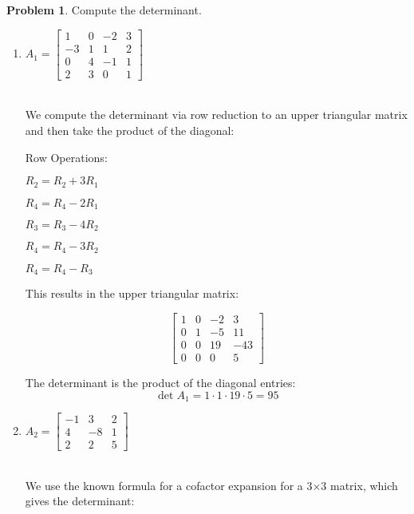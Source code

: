 \documentclass[12pt, oneside]{amsart}
\theoremstyle{definition}
\newtheorem{prob}{Problem}
\begin{document}
\begin{prob} Compute the determinant.
\begin{enumerate}
    \item $A_1= \left[\begin{matrix}
        1 & 0 & -2 & 3 \\
        -3 & 1 & 1 & 2 \\
        0 & 4 & -1 & 1 \\
        2 & 3 & 0 & 1
    \end{matrix}\right]$\\\\
    
    \begin{solution}
    We compute the determinant via row reduction to an upper triangular matrix and then take the product of the diagonal:
    
    Row Operations:
    
    $R_2 = R_2 + 3R_1$
    
    $R_4 = R_4 - 2R_1$
    
    $R_3 = R_3 - 4R_2$
    
    $R_4 = R_4 - 3R_2$
    
    $R_4 = R_4 - R_3$

    This results in the upper triangular matrix:
    
    \[
    \begin{bmatrix}
    1 & 0 & -2 & 3 \\
    0 & 1 & -5 & 11 \\
    0 & 0 & 19 & -43 \\
    0 & 0 & 0 & 5
    \end{bmatrix}
    \]
    
    The determinant is the product of the diagonal entries:
    \[
    \det A_1 = 1 \cdot 1 \cdot 19 \cdot 5 = 95
    \]
    \end{solution}
    
    \item $A_2= \left[\begin{matrix}
        -1 & 3 & 2 \\4 & -8 & 1 \\
        2 & 2 & 5
    \end{matrix}\right]$\\\\
    
    \begin{solution}
    We use the known formula for a cofactor expansion for a 3×3 matrix, which gives the determinant:
    

\end{solution}
\end{enumerate}
\end{prob}
\end{document}
